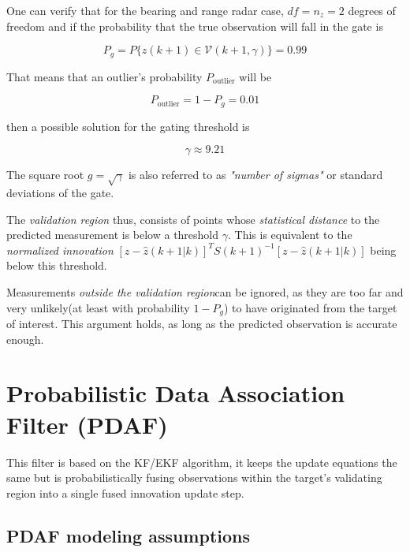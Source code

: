 One can verify that for the bearing and range radar case, $df = n_z =2 $ degrees of freedom and if the probability that the true observation will fall in the gate is

$$P_{g} = P\{ z(k+1)\in\mathcal{V}(k+1,\gamma)\}=0.99$$


That means that an outlier's probability $P_{\text{outlier}}$ will be

$$P_{\text{outlier}} = 1 - P_g = 0.01$$

then a possible solution for the gating threshold is

$$\gamma \approx 9.21$$


The square root $g = \sqrt{\gamma}$ is also referred to as \emph{
"number of sigmas"} or standard deviations of the gate.

The \emph{validation region} thus, consists of points whose  \emph{statistical distance} to the predicted measurement is below a threshold $\gamma$.  This is equivalent to the \emph{normalized innovation} $[z-\hat{z}(k+1|k)]^T S(k+1)^{-1} [z-\hat{z}(k+1|k)]$ being below this threshold.

Measurements \emph{outside the validation region}can be ignored, as they are too far and very unlikely(at least with probability $1-P_g$) to have originated from the target of interest. This argument holds, as long as the predicted observation is accurate enough.
\section{Probabilistic Data Association Filter (PDAF)}

This filter is based on the KF/EKF algorithm, it keeps the update equations the same but is probabilistically fusing
observations within the target's validating region into a single fused innovation update step.

\subsection{PDAF modeling assumptions}

